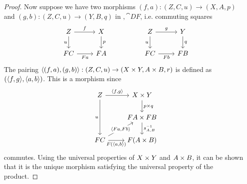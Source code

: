 \begin{lem}
\begin{proof}
Now suppose we have two morphisms $(f, a) : (Z, C, u) \to (X, A, p)$ and $(g, b) : (Z, C, u) \to (Y, B, q)$ in $\comma{\cat{D}}{F}$, i.e. commuting squares
\[\begin{tikzcd}
	Z & X && Z & Y \\
	FC & FA && FC & FB
	\arrow["u"', from=1-4, to=2-4]
	\arrow["q", from=1-5, to=2-5]
	\arrow["g", from=1-4, to=1-5]
	\arrow["Fb"', from=2-4, to=2-5]
	\arrow["u"', from=1-1, to=2-1]
	\arrow["p", from=1-2, to=2-2]
	\arrow["f", from=1-1, to=1-2]
	\arrow["Fa"', from=2-1, to=2-2]
\end{tikzcd}\]
The pairing $\langle (f, a), (g, b) \rangle : (Z, C, u) \to (X \times Y, A \times B, r)$ is defined as $(\langle f, g \rangle, \langle a, b \rangle)$.
This is a morphism since
\[\begin{tikzcd}
	Z & {\cprod{X}{Y}} \\
	& {\cprod{FA}{FB}} \\
	FC & {F(\cprod{A}{B})}
	\arrow["u"', from=1-1, to=3-1]
	\arrow["{\mpair{f}{g}}", from=1-1, to=1-2]
	\arrow["{\cprod{p}{q}}", from=1-2, to=2-2]
	\arrow["{\inv{\prodcmp[A,B]}}", from=2-2, to=3-2]
	\arrow["{F(\mpair{a}{b})}"', from=3-1, to=3-2]
	\arrow["{\mpair{Fa}{Fb}}"{description}, from=3-1, to=2-2]
\end{tikzcd}\]
commutes.
Using the universal properties of $X \times Y$ and $A \times B$, it can be shown that it is the unique morphism satisfying the universal property of the product.
\end{proof}
\end{lem}


